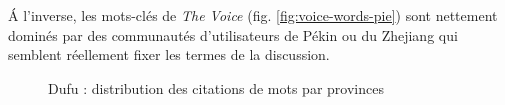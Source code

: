 \'A l{\textquoteright}inverse, les mots-cl\'es de \textit{The Voice} (fig. \ref{fig:voice-words-pie}) sont
nettement domin\'es par des communaut\'es d{\textquoteright}utilisateurs de P\'ekin ou du Zhejiang qui semblent r\'eellement fixer les termes de la discussion.

\begin{figure}
    \centering
    \newline
    \caption{
      Dufu : distribution des citations de mots par provinces 
    }
    \label{fig:biaoge-words-pie}
\end{figure}

